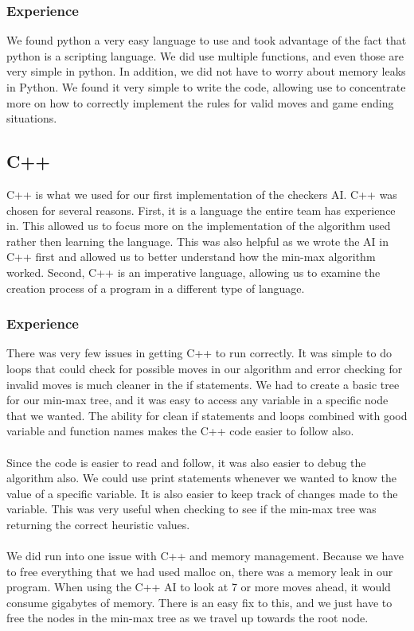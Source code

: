 \documentclass[12pt]{article}
\begin{document}
        \subsubsection{Experience}
            We found python a very easy language to use and took advantage of the fact that python is a scripting language. We did use multiple functions, and even those are very simple in python. In addition, we did not have to worry about memory leaks in Python. We found it very simple to write the code, allowing use to concentrate more on how to correctly implement the rules for valid moves and game ending situations.

    \subsection{C++}
        C++ is what we used for our first implementation of the checkers AI. C++ was chosen for several reasons. First, it is a language the entire team has experience in. This allowed us to focus more on the implementation of the algorithm used rather then learning the language. This was also helpful as we wrote the AI in C++ first and allowed us to better understand how the min-max algorithm worked. Second, C++ is an imperative language, allowing us to examine the creation process of a program in a different type of language.

        \subsubsection{Experience}
            There was very few issues in getting C++ to run correctly. It was simple to do loops that could check for possible moves in our algorithm and error checking for invalid moves is much cleaner in the if statements. We had to create a basic tree for our min-max tree, and it was easy to access any variable in a specific node that we wanted. The ability for clean if statements and loops combined with good variable and function names makes the C++ code easier to follow also. \\ \\
            Since the code is easier to read and follow, it was also easier to debug the algorithm also. We could use print statements whenever we wanted to know the value of a specific variable. It is also easier to keep track of changes made to the variable. This was very useful when checking to see if the min-max tree was returning the correct heuristic values. \\ \\
            We did run into one issue with C++ and memory management. Because we have to free everything that we had used malloc on, there was a memory leak in our program. When using the C++ AI to look at 7 or more moves ahead, it would consume gigabytes of memory. There is an easy fix to this, and we just have to free the nodes in the min-max tree as we travel up towards the root node.
\end{document}
